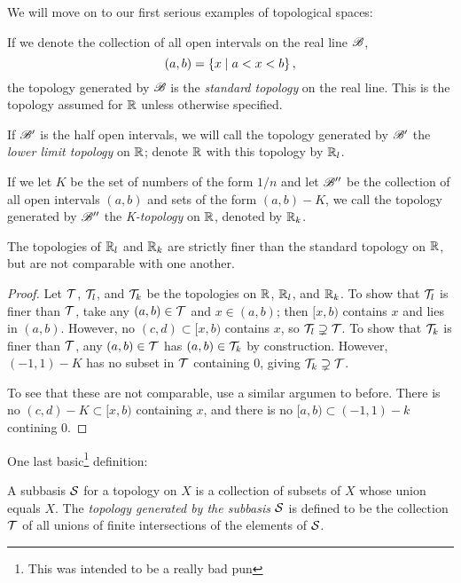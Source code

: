 \documentclass[10pt]{report}
\begin{document}
  We will move on to our first serious examples of topological spaces:
  \begin{definition}
    If we denote the collection of all open intervals on the real line $\mathscr{B}$, 
    \[ \left( a,b \right) = \left\{ x \mid a < x < b  \right\}, \]
    the topology generated by $\mathscr{B}$ is the \emph{standard topology} on the real line.
    This is the topology assumed for $\mathbb{R}$ unless otherwise specified.

    If $\mathscr{B}'$ is the half open intervals, we will call the topology generated by $\mathscr{B}'$ the \emph{lower limit topology} on $\mathbb{R}$; denote $\mathbb{R}$ with this topology by $\mathbb{R}_l$.

    If we let $K$ be the set of numbers of the form $1/n$ and let $\mathscr{B}''$ be the collection of all open intervals $(a,b)$ and sets of the form $(a,b) - K$, we call the topology generated by $\mathscr{B}''$ the \emph{K-topology} on $\mathbb{R}$, denoted by $\mathbb{R}_k$.
  \end{definition}

  \begin{lemma}
    The topologies of $\mathbb{R}_l$ and $\mathbb{R}_k$ are strictly finer than the standard topology on $\mathbb{R}$, but are not comparable with one another.
  \end{lemma}
  \begin{proof}
    Let $\mathcal{T}$, $\mathcal{T}_l$, and $\mathcal{T}_k$ be the topologies on $\mathbb{R}$, $\mathbb{R}_l$, and $\mathbb{R}_k$.
    To show that $\mathcal{T}_l$ is finer than $\mathcal{T}$, take any $(a,b) \in \mathcal{T}$ and $x \in (a,b)$; then $[x,b)$ contains $x$ and lies in $(a,b)$.
    However, no $(c,d) \subset [x,b)$ contains $x$, so $\mathcal{T}_l \supsetneq \mathcal{T}$.
    To show that $\mathcal{T}_k$ is finer than $\mathcal{T}$, any $(a,b) \in \mathcal{T}$ has $(a,b) \in \mathcal{T}_k$ by construction.
    However, $(-1,1) - K$ has no subset in $\mathcal{T}$ containing 0, giving $\mathcal{T}_k \supsetneq \mathcal{T}$.
  
    To see that these are not comparable, use a similar argumen to before.
    There is no $(c,d) - K \subset [x,b)$ containing $x$, and there is no $[a,b) \subset (-1,1)-k$ contining $0$.
  \end{proof}

  One last basic\footnote{This was intended to be a really bad pun} definition:
  \begin{definition}
    A subbasis $\mathcal{S}$ for a topology on $X$ is a collection of subsets of $X$ whose union equals $X$.
    The \emph{topology generated by the subbasis $\mathcal{S}$} is defined to be the collection $\mathcal{T}$ of all unions of finite intersections of the elements of $\mathcal{S}$.
  \end{definition}
\end{document}
